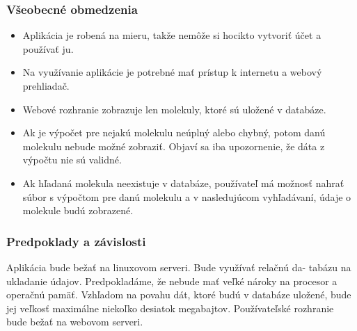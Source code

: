 \documentclass[12pt,a4paper]{article}
\begin{document}
\subsubsection{Všeobecné obmedzenia}
\begin{itemize}
	\item Aplikácia je robená na mieru, takže nemôže si hocikto vytvoriť účet a používať ju.
	\item Na využívanie aplikácie je potrebné mať prístup k internetu a webový prehliadač.
	\item Webové rozhranie zobrazuje len molekuly, ktoré sú uložené v databáze.
	\item Ak je výpočet pre nejakú molekulu neúplný alebo chybný, potom danú molekulu nebude možné zobraziť. Objaví sa iba upozornenie, že dáta z výpočtu nie sú validné.
	\item Ak hľadaná molekula neexistuje v databáze, používateľ má možnosť nahrať súbor s výpočtom pre danú molekulu a v nasledujúcom vyhľadávaní, údaje o molekule budú zobrazené.
\end{itemize}

\subsubsection{Predpoklady a závislosti}
Aplikácia bude bežať na linuxovom serveri. Bude využívať relačnú da-
tabázu na ukladanie údajov. Predpokladáme, že nebude mať veľké nároky
na procesor a operačnú pamäť. Vzhľadom na povahu dát, ktoré budú v
databáze uložené, bude jej veľkosť maximálne niekoľko desiatok megabajtov.
Používateľské rozhranie bude bežať na webovom serveri.
\end{document}
